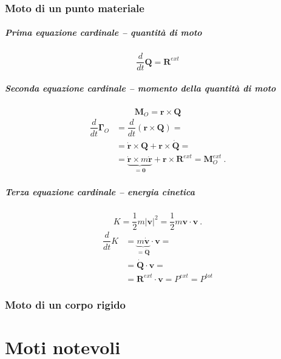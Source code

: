 \subsection{Moto di un punto materiale}
\paragraph{Prima equazione cardinale -- quantità di moto}
\begin{equation}
    \dfrac{d}{dt} \mathbf{Q} = \mathbf{R}^{ext}
\end{equation}

\paragraph{Seconda equazione cardinale -- momento della quantità di moto}
\begin{equation} \mathbf{M}_O = \mathbf{r} \times \mathbf{Q} \end{equation}
\begin{equation}
\begin{aligned}
    \dfrac{d}{dt} \mathbf{\Gamma}_O
    & = \dfrac{d}{dt} \left( \mathbf{r} \times \mathbf{Q} \right) = \\
    & = \dot{\mathbf{r}} \times \mathbf{Q} + \mathbf{r} \times \dot{\mathbf{Q}} = \\
    & = \underbrace{\dot{\mathbf{r}} \times m \dot{\mathbf{r}}}_{=\mathbf{0}} + \mathbf{r} \times \mathbf{R}^{ext} = \mathbf{M}_O^{ext} \ .
\end{aligned}
\end{equation}
\paragraph{Terza equazione cardinale -- energia cinetica}

\begin{equation} K = \dfrac{1}{2} m |\mathbf{v}|^2 = \dfrac{1}{2} m \mathbf{v} \cdot \mathbf{v} \ .
\end{equation}
\begin{equation}
\begin{aligned}
    \dfrac{d}{dt} K & = \underbrace{m \dot{\mathbf{v}}}_{=\dot{\mathbf{Q}}} \cdot \mathbf{v} = \\
    & = \dot{\mathbf{Q}} \cdot \mathbf{v} = \\
    & = \mathbf{R}^{ext} \cdot \mathbf{v} = P^{ext} = P^{tot}
\end{aligned}
\end{equation}


\subsection{Moto di un corpo rigido}



\chapter{Moti notevoli}\label{mechanics:motions}
